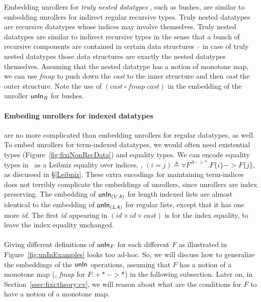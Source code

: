 Embedding unrollers for \emph{truly nested datatypes} \cite{AbeMatUus05},
such as bushes, are similar to embedding unrollers for indirect regular
recursive types. Truly nested datatypes are recursive datatypes whose
indices may involve themselves. Truly nested datatypes are similar to
indirect recursive types in the sense that a bunch of recursive components
are contained in certain data structures -- in case of truly nested datatypes
those data structures are exactly the nested datatypes themselves.
Assuming that the nested datatype has a notion of monotone map, we can
use \textit{fmap} to push down the \textit{cast} to the inner structure
and then \textit{cast} the outer structure. Note the use of
$(\textit{cast} \circ \textit{fmap}\;\textit{cast})$ in the embedding of
the unroller $\mathsf{unIn}_R$ for bushes.

\paragraph{Embeding unrollers for indexed datatypes} are no more complicated
than embedding unrollers for regular datatypes, as well. To embed unrollers
for term-indexed datatypes, we would often need existential types
(Figure~\ref{fig:fixiNonRecData}) and equality types. We can encode
equality types in \Fixi\ as a Leibniz equality over indices,
\ie, $(i=j) \triangleq \forall F^{A -> *}.F\{i\} -> F\{j\}$,
as discussed in \S\ref{Leibniz}. These extra encodings for maintaining
term-indices does not terribly complicate the embeddings of unrollers,
since unrollers are index preserving. The embedding of $\mathsf{unIn}_{(V A)}$ for
length indexed lists are almost identical to the embedding of $\mathsf{unIn}_{(L A)}$
for regular lists, except that it has one more \textit{id}. The first
\textit{id} appearing in $(\textit{id}\times\textit{id}\times\textit{cast})$ is
for the index equality, to leave the index equality unchanged.

\paragraph{}
Giving different definitions of $\mathsf{unIn}_F$ for each different $F$ as illustrated
in Figure~\ref{fig:unInExamples} looks too ad-hoc. So, we will discuss how to
generalize the embeddings of the $\mathsf{unIn}$ operations, assuming that $F$ has
a notion of a monotone map (\eg, \textit{fmap} for $F:+* ->*$) in the following
subsection. Later on, in Section~\ref{ssec:fixi:theory:cv}, we will
reason about what are the conditions for $F$ to have a notion of a monotone map.

